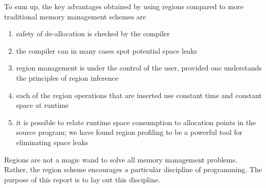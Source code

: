 \documentclass[12pt]{book}
\begin{document}
To sum up, the key advantages obtained by using regions compared to more
traditional memory management schemes are
\begin{enumerate}
\item safety of de-allocation is checked by the compiler
\item the compiler can in many cases spot potential space leaks
\item region management is under the control of the user, provided one
  understands the principles of region inference
\item each of the region operations that are inserted use constant
  time and constant space at runtime
\item it is possible to relate runtime space consumption to allocation
  points in the source program; we have found region profiling to be a
  powerful tool for eliminating space leaks
\end{enumerate}
Regions are not a magic wand to solve all memory management problems.
Rather, the region scheme encourages a particular discipline of
programming. The purpose of this report is to lay out this discipline.
\end{document}
